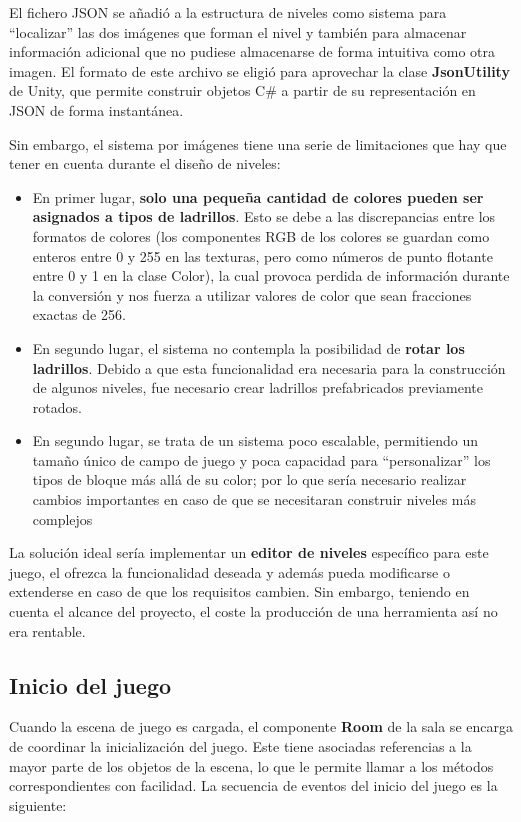 El fichero JSON se añadió a la estructura de niveles como sistema para ``localizar'' las dos imágenes que forman el nivel y también para almacenar información adicional que no pudiese almacenarse de forma intuitiva como otra imagen. El formato de este archivo se eligió para aprovechar la clase \textbf{JsonUtility} de Unity, que permite construir objetos C\# a partir de su representación en JSON de forma instantánea. 

Sin embargo, el sistema por imágenes tiene una serie de limitaciones que hay que tener en cuenta durante el diseño de niveles:
\begin{itemize}
  \item En primer lugar, \textbf{solo una pequeña cantidad de colores pueden ser asignados a tipos de ladrillos}. Esto se debe a las discrepancias entre los formatos de colores (los componentes RGB de los colores se guardan como enteros entre 0 y 255 en las texturas, pero como números de punto flotante entre 0 y 1 en la clase Color), la cual provoca perdida de información durante la conversión y nos fuerza a utilizar valores de color que sean fracciones exactas de 256. 
  \item En segundo lugar, el sistema no contempla la posibilidad de \textbf{rotar los ladrillos}. Debido a que esta funcionalidad era necesaria para la construcción de algunos niveles, fue necesario crear ladrillos prefabricados previamente rotados.
  \item En segundo lugar, se trata de un sistema poco escalable, permitiendo un tamaño único de campo de juego y poca capacidad para ``personalizar'' los tipos de bloque más allá de su color; por lo que sería necesario realizar cambios importantes en caso de que se necesitaran construir niveles más complejos
\end{itemize}
La solución ideal sería implementar un \textbf{editor de niveles} específico para este juego, el ofrezca la funcionalidad  deseada y además pueda modificarse o extenderse en caso de que los requisitos cambien. Sin embargo, teniendo en cuenta el alcance del proyecto, el coste la producción de una herramienta así no era rentable.

\subsection{Inicio del juego}
Cuando la escena de juego es cargada, el componente \textbf{Room} de la sala se encarga de coordinar la inicialización del juego. Este tiene asociadas referencias a la mayor parte de los objetos de la escena, lo que le permite llamar a los métodos correspondientes con facilidad. La secuencia de eventos del inicio del juego es la siguiente:

